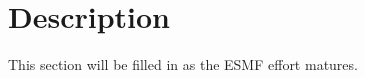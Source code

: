 
\section{Description}

This section will be filled in as the ESMF effort matures.







































